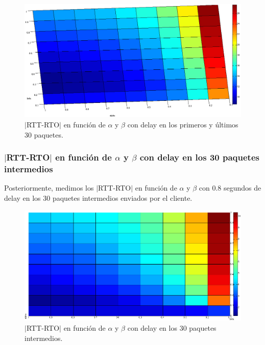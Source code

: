 \documentclass[10pt, a4paper]{article}
\begin{document}
\begin{figure}[H]
\begin{center}
\includegraphics[width=17cm]{delay-30F30L-costado.png}
\caption{$|$RTT-RTO$|$ en función de $\alpha$ y $\beta$ con delay en los primeros y últimos 30 paquetes.}
\end{center}
\end{figure}


\subsubsection{$|$RTT-RTO$|$ en función de $\alpha$ y $\beta$ con delay en los 30 paquetes intermedios}
Posteriormente, medimos los $|$RTT-RTO$|$ en función de $\alpha$ y $\beta$ con 0.8 segundos de delay en los 30 paquetes intermedios enviados por el cliente.

\begin{figure}[H]
\begin{center}
\includegraphics[width=17cm]{delay-30I.png}
\caption{$|$RTT-RTO$|$ en función de $\alpha$ y $\beta$ con delay en los 30 paquetes intermedios.}
\end{center}
\end{figure}
\end{document}
